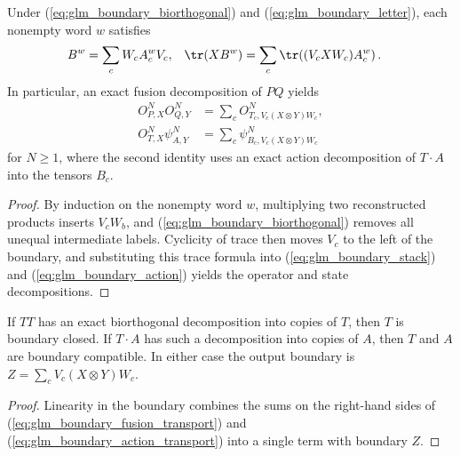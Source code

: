 \begin{lemma}
    \label{thm:glm_boundary_decomposition}
    \leanok
    Under (\ref{eq:glm_boundary_biorthogonal}) and
    (\ref{eq:glm_boundary_letter}), each nonempty word $w$ satisfies
    \begin{align}
        B^w       & =\sum_cW_cA_c^wV_c,                      &
        \tr(XB^w) & =\sum_c\tr\!\left((V_cXW_c)A_c^w\right).
        \label{eq:glm_boundary_word}
    \end{align}
    In particular, an exact fusion decomposition of $PQ$ yields
    \begin{align}
        O^N_{P,X}O^N_{Q,Y}
         & =\sum_c O^N_{T_c,V_c(X\otimes Y)W_c},
        \label{eq:glm_boundary_fusion_transport}  \\
        O^N_{T,X}\psi^N_{A,Y}
         & =\sum_c\psi^N_{B_c,V_c(X\otimes Y)W_c}
        \label{eq:glm_boundary_action_transport}
    \end{align}
    for $N\geq1$, where the second identity uses an exact action
    decomposition of $T\cdot A$ into the tensors $B_c$.
\end{lemma}
\begin{proof}
    \leanok
    By induction on the nonempty word $w$, multiplying two reconstructed
    products inserts $V_cW_b$, and (\ref{eq:glm_boundary_biorthogonal})
    removes all unequal intermediate labels. Cyclicity of trace then moves
    $V_c$ to the left of the boundary, and substituting this trace formula
    into (\ref{eq:glm_boundary_stack}) and (\ref{eq:glm_boundary_action})
    yields the operator and state decompositions.
\end{proof}

\begin{lemma}
    \label{thm:glm_boundary_closedness_of_decomposition}
    \leanok
    If $TT$ has an exact biorthogonal decomposition into copies of $T$,
    then $T$ is boundary closed. If $T\cdot A$ has such a decomposition
    into copies of $A$, then $T$ and $A$ are boundary compatible.
    In either case the output boundary is
    $Z=\sum_cV_c(X\otimes Y)W_c$.
\end{lemma}
\begin{proof}
    \leanok
    Linearity in the boundary combines the sums on the right-hand sides of
    (\ref{eq:glm_boundary_fusion_transport}) and
    (\ref{eq:glm_boundary_action_transport}) into a single term with boundary
    $Z$.
\end{proof}

